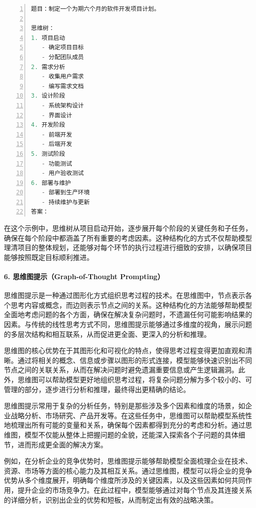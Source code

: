 \begin{lstlisting}[language={python},label={},caption={}, basicstyle=\footnotesize\ttfamily, breaklines=true, numbers=left, frame=single]
题目：制定一个为期六个月的软件开发项目计划。

思维树：
1. 项目启动
   - 确定项目目标
   - 分配团队成员
2. 需求分析
   - 收集用户需求
   - 编写需求文档
3. 设计阶段
   - 系统架构设计
   - 界面设计
4. 开发阶段
   - 前端开发
   - 后端开发
5. 测试阶段
   - 功能测试
   - 用户验收测试
6. 部署与维护
   - 部署到生产环境
   - 持续维护与更新
答案：
\end{lstlisting}

在这个示例中，思维树从项目启动开始，逐步展开每个阶段的关键任务和子任务，确保在每个阶段中都涵盖了所有重要的考虑因素。这种结构化的方式不仅帮助模型理清项目的整体规划，还能够对每个环节的执行过程进行细致的安排，以确保项目能够按照既定目标顺利推进。

\paragraph{6. 思维图提示（Graph-of-Thought Prompting）} 

思维图提示是一种通过图形化方式组织思考过程的技术。在思维图中，节点表示各个思考内容或概念，而边则表示节点之间的关系。这种结构化的方法能够帮助模型全面地考虑问题的各个方面，确保在解决复杂问题时，不遗漏任何可能影响结果的因素。与传统的线性思考方式不同，思维图提示能够通过多维度的视角，展示问题的多层次结构和相互联系，从而促进更全面、更深入的分析和推理。

思维图的核心优势在于其图形化和可视化的特点，使得思考过程变得更加直观和清晰。通过将相关的概念、信息或步骤以图形的形式连接，模型能够快速识别出不同节点之间的关联关系，从而在解决问题时避免遗漏重要信息或产生逻辑漏洞。此外，思维图可以帮助模型更好地组织思考过程，将复杂问题分解为多个较小的、可管理的部分，逐步进行分析和推理，最终得出更精确的结论。

思维图提示常用于复杂的分析任务，特别是那些涉及多个因素和维度的场景，如企业战略分析、市场研究、产品开发等。在这些任务中，思维图可以帮助模型系统性地梳理出所有可能的变量和关系，确保每个因素都得到充分的考虑和分析。通过思维图，模型不仅能从整体上把握问题的全貌，还能深入探索各个子问题的具体细节，进而形成更全面的解决方案。

例如，在分析企业的竞争优势时，思维图提示能够帮助模型全面梳理企业在技术、资源、市场等方面的核心能力及其相互关系。通过思维图，模型可以将企业的竞争优势从多个维度展开，明确每个维度所涉及的关键因素，以及这些因素如何共同作用，提升企业的市场竞争力。在此过程中，模型能够通过对每个节点及其连接关系的详细分析，识别出企业的优势和短板，从而制定出有效的战略决策。



